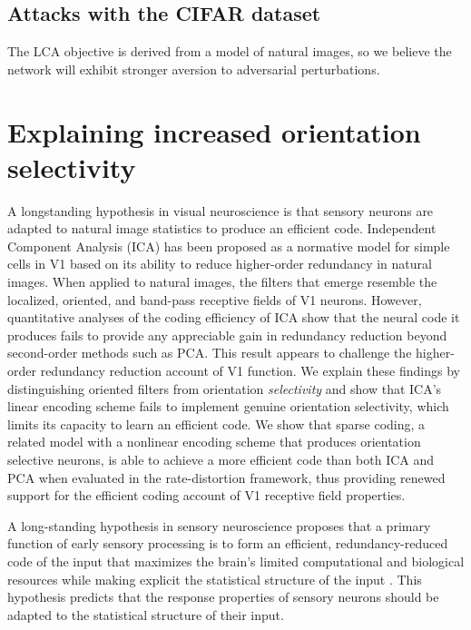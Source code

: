 \subsection{Attacks with the CIFAR dataset}
The LCA objective is derived from a model of natural images, so we believe the network will exhibit stronger aversion to adversarial perturbations.

\section{Explaining increased orientation selectivity}
A longstanding hypothesis in visual neuroscience is that sensory neurons are adapted to natural image statistics to produce an efficient code. Independent Component Analysis (ICA) has been proposed as a normative model for simple cells in V1 based on its ability to reduce higher-order redundancy in natural images. When applied to natural images, the filters that emerge resemble the localized, oriented, and band-pass receptive fields of V1 neurons. However, quantitative analyses of the coding efficiency of ICA show that the neural code it produces fails to provide any appreciable gain in redundancy reduction beyond second-order methods such as PCA. This result appears to challenge the higher-order redundancy reduction account of V1 function. We explain these findings by distinguishing oriented filters from orientation \textit{selectivity} and show that ICA's linear encoding scheme fails to implement genuine orientation selectivity, which limits its capacity to learn an efficient code. We show that sparse coding, a related model with a nonlinear encoding scheme that produces orientation selective neurons, is able to achieve a more efficient code than both ICA and PCA when evaluated in the rate-distortion framework, thus providing renewed support for the efficient coding account of V1 receptive field properties.

A long-standing hypothesis in sensory neuroscience proposes that a primary function of early sensory processing is to form an efficient, redundancy-reduced code of the input that maximizes the brain's limited computational and biological resources while making explicit the statistical structure of the input \parencite{barlow2001redundancy}. This hypothesis predicts that the response properties of sensory neurons should be adapted to the statistical structure of their input.

